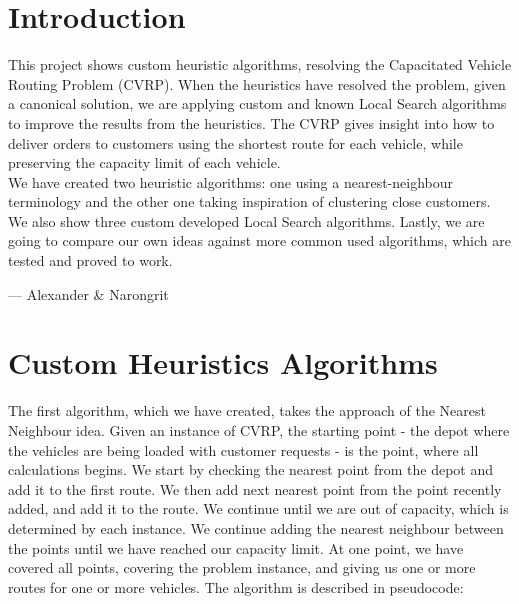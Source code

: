 \documentclass[12pt]{article}
\begin{document}

\tableofcontents
\pagebreak


\section{Introduction}

This project shows custom heuristic algorithms, resolving the Capacitated Vehicle Routing Problem (CVRP). When the heuristics have resolved the problem, given a canonical solution, we are applying custom \- and known \- Local Search algorithms to improve the results from the heuristics. 
The CVRP gives insight into how to deliver orders to customers using the shortest route for each vehicle, while preserving the capacity limit of each vehicle.\\
We have created two heuristic algorithms: one using a nearest-neighbour terminology and the other one taking inspiration of clustering close customers. We also show three custom developed Local Search algorithms. 
Lastly, we are going to compare our own ideas against more common used algorithms, which are tested and proved to work. 

\hspace{1 cm}--- Alexander \& Narongrit

\newpage

\section{Custom Heuristics Algorithms} 


The first algorithm, which we have created, takes the approach of the Nearest Neighbour idea. Given an instance of CVRP, the starting point - the depot where the vehicles are being loaded with customer requests - is the point, where all calculations begins. 
We start by checking the nearest point from the depot and add it to the first route. We then add next nearest point from the point recently added, and add it to the route. We continue until we are out of capacity, which is determined by each instance. We continue adding the nearest neighbour between the points until we have reached our capacity limit. At one point, we have covered all points, covering the problem instance, and giving us one or more routes for one or more vehicles.
The algorithm is described in pseudocode:
\newline
\end{document}
